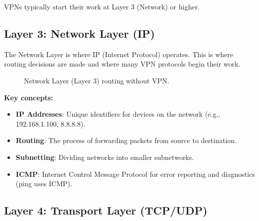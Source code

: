 VPNs typically start their work at Layer 3 (Network) or higher.

\subsection{Layer 3: Network Layer (IP)}

The Network Layer is where IP (Internet Protocol) operates. This is where routing decisions are made and where many VPN protocols begin their work.

\begin{figure}[h]
    \centering
    \caption{Network Layer (Layer 3) routing without VPN.}
\end{figure}

\textbf{Key concepts:}
\begin{itemize}
    \item \textbf{IP Addresses}: Unique identifiers for devices on the network (e.g., 192.168.1.100, 8.8.8.8).
    \item \textbf{Routing}: The process of forwarding packets from source to destination.
    \item \textbf{Subnetting}: Dividing networks into smaller subnetworks.
    \item \textbf{ICMP}: Internet Control Message Protocol for error reporting and diagnostics (ping uses ICMP).
\end{itemize}

\subsection{Layer 4: Transport Layer (TCP/UDP)}

